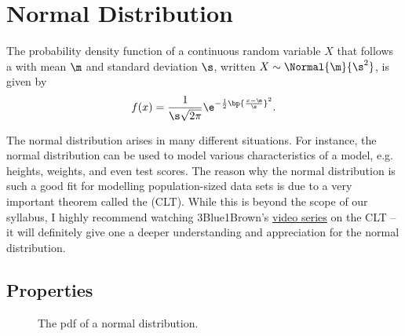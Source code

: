 \section{Normal Distribution}

\begin{definition}
    The probability density function of a continuous random variable $X$ that follows a  with mean $\m$ and standard deviation $\s$, written $X \sim \Normal{\m}{\s^2}$, is given by \[f(x) = \frac1{\s \sqrt{2\pi}} \e^{-\frac12 \bp{\frac{x-\m}{\s}}^2}.\]
\end{definition}

The normal distribution arises in many different situations. For instance, the normal distribution can be used to model various characteristics of a model, e.g. heights, weights, and even test scores. The reason why the normal distribution is such a good fit for modelling population-sized data sets is due to a very important theorem called the  (CLT). While this is beyond the scope of our syllabus, I highly recommend watching 3Blue1Brown's \href{https://www.youtube.com/playlist?list=PLZHQObOWTQDOMxJDswBaLu8xBMKxSTvg8}{video series} on the CLT -- it will definitely give one a deeper understanding and appreciation for the normal distribution.

\subsection{Properties}

\begin{figure}[H]
    \centering
    \caption{The pdf of a normal distribution.}
\end{figure}

